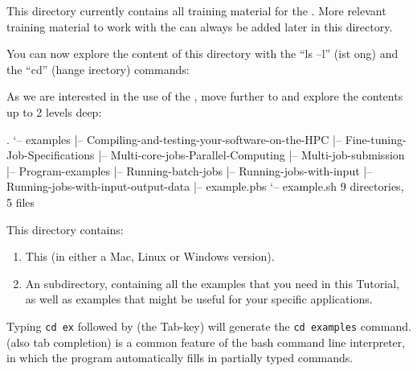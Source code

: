 This directory currently contains all training material for the .
More relevant training material to work with the \hpc can always be added
later in this directory.

You can now explore the content of this directory with the ``ls --l''
(ist ong) and the ``cd'' (hange
irectory) commands:

As we are interested in the use of the , move further to
 and explore the contents up to 2 levels deep:

\begin{prompt}
.
`-- examples
    |-- Compiling-and-testing-your-software-on-the-HPC
    |-- Fine-tuning-Job-Specifications
    |-- Multi-core-jobs-Parallel-Computing
    |-- Multi-job-submission
    |-- Program-examples
    |-- Running-batch-jobs
    |-- Running-jobs-with-input
    |-- Running-jobs-with-input-output-data
    |-- example.pbs
    `-- example.sh
9 directories, 5 files
\end{prompt}

This directory contains:

\begin{enumerate}
  \item This  (in either a Mac, Linux or Windows version).
  \item An  subdirectory, containing all the
    examples that you need in this Tutorial, as well as examples that might be
    useful for your specific applications.
\end{enumerate}

\begin{prompt}
\end{prompt}

\begin{tip}
Typing \lstinline|cd ex| followed by \keys{\tab} (the Tab-key) will generate the
\lstinline|cd examples| command. (also tab completion) is a common feature of the bash command line
interpreter, in which the program automatically fills in partially typed
commands.
\end{tip}

